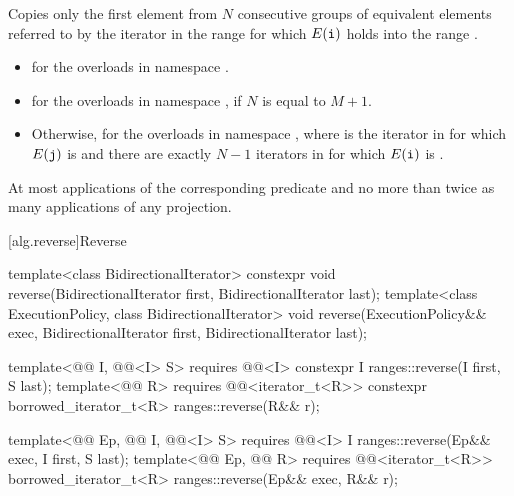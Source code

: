 \begin{itemdescr}
\pnum
\effects
Copies only the first element from $N$ consecutive groups of equivalent elements
referred to by the iterator  in the range 
for which $E(\tcode{i})$ holds
into the range .

\pnum
\returns
\begin{itemize}
\item
  for the overloads in namespace .
\item
  for the overloads in namespace ,
  if $N$ is equal to $M + 1$.
\item
  Otherwise, 
  for the overloads in namespace ,
  where  is the iterator in 
  for which $E(\tcode{j})$ is 
  and there are exactly $N - 1$ iterators  in 
  for which $E(\tcode{i})$ is .
\end{itemize}

\pnum
\complexity
At most  applications
of the corresponding predicate
and no more than twice as many applications of any projection.
\end{itemdescr}

[alg.reverse]{Reverse}

%
\begin{itemdecl}
template<class BidirectionalIterator>
  constexpr void reverse(BidirectionalIterator first, BidirectionalIterator last);
template<class ExecutionPolicy, class BidirectionalIterator>
  void reverse(ExecutionPolicy&& exec,
               BidirectionalIterator first, BidirectionalIterator last);

template<@@ I, @@<I> S>
  requires @@<I>
  constexpr I ranges::reverse(I first, S last);
template<@@ R>
  requires @@<iterator_t<R>>
  constexpr borrowed_iterator_t<R> ranges::reverse(R&& r);

template<@@ Ep, @@ I, @@<I> S>
  requires @@<I>
  I ranges::reverse(Ep&& exec, I first, S last);
template<@@ Ep, @@ R>
  requires @@<iterator_t<R>>
  borrowed_iterator_t<R> ranges::reverse(Ep&& exec, R&& r);
\end{itemdecl}

